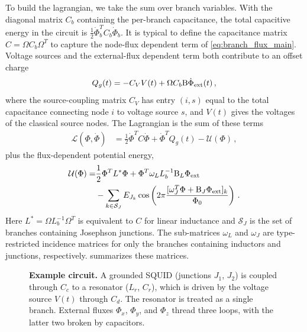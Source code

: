 To build the lagrangian, we take the sum over branch variables. With the diagonal matrix $C_b$ containing the per-branch capacitance, the total capacitive energy in the circuit is $\tfrac{1}{2}\dot\Phi_b^T C_b \dot\Phi_b$.
It is typical to define the capacitance matrix $C = \Omega C_b \Omega^T$ to capture the node-flux dependent term of \cref{eq:branch_flux_main}.
Voltage sources and the external-flux dependent term both contribute to an offset charge
\begin{align}
    Q_g(t) = -C_V V(t) + \Omega C_b \mathrm{B}\dot\Phi_{\rm ext}(t) \, ,
    \label{eq:Q_g_node}
\end{align}
where the source-coupling matrix $C_V$ has entry $(i,s)$ equal to the total capacitance connecting node $i$ to voltage source $s$, and $V(t)$ gives the voltages of the classical source nodes.
The Lagrangian is the sum of these terms
\begin{align}
    \mathcal{L}(\Phi,\dot\Phi) &= \frac{1}{2}\dot\Phi^TC\dot\Phi + \dot\Phi^T Q_g(t) - \mathcal{U}(\Phi) \, ,
    \label{eq:L_node_standard}
\end{align}
plus the flux-dependent potential energy,
\begin{equation}
\begin{aligned}
    \mathcal{U}(\Phi) = &\frac{1}{2}\Phi^T L^*\Phi + \Phi^T \omega_{L} L_b^{-1} \mathrm{B}_L \Phi_{\rm ext} \\
    &- \sum_{k\in\mathcal{S}_J}E_{J_k}\cos\left(2\pi\frac{[\omega_{J}^T\Phi + \mathrm{B}_J\Phi_{\rm ext}]_k}{\Phi_0}\right) \, .
    \label{eq:U_final}
\end{aligned}
\end{equation}
Here $L^* = \Omega L^{-1}_b\Omega^T$ is equivalent to $C$ for linear inductance and $\mathcal{S}_J$ is the set of branches containing Josephson junctions. The sub-matrices $\omega_L$ and $\omega_J$ are type-restricted incidence matrices for only the branches containing inductors and junctions, respectively.
 summarizes these matrices.

\begin{figure}[t]
    \centering
    
    \caption{{\bf Example circuit.}
    A grounded SQUID (junctions $J_1$, $J_2$) is coupled through $C_c$ to a resonator ($L_r$, $C_r$), which is driven by the voltage source $V(t)$ through $C_d$.
    The resonator is treated as a single branch.
    External fluxes $\Phi_x$, $\Phi_y$, and $\Phi_z$ thread three loops, with the latter two broken by capacitors.}
    \label{fig:example_circuit}
\end{figure}

